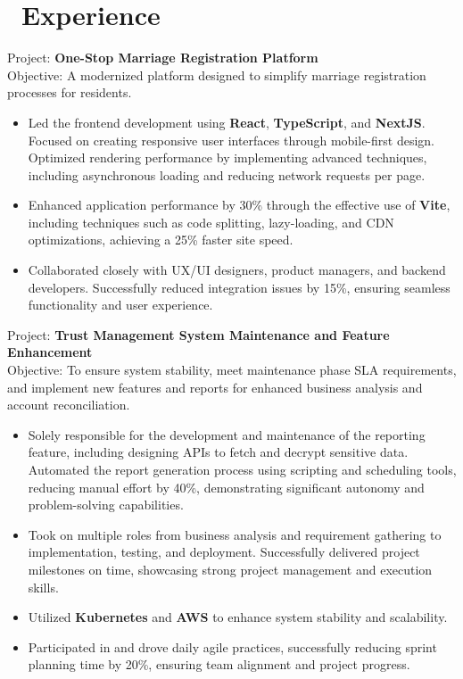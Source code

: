 \documentclass{resume}
\begin{document}
\onehalfspacing
{}



\section{\faUsers\ Experience}
\role{Software Developer}

Project: \textbf{One-Stop Marriage Registration Platform} \\
Objective: A modernized platform designed to simplify marriage registration processes for residents.
\begin{itemize}
  \item Led the frontend development using \textbf{React}, \textbf{TypeScript}, and \textbf{NextJS}. Focused on creating responsive user interfaces through mobile-first design. Optimized rendering performance by implementing advanced techniques, including asynchronous loading and reducing network requests per page.
  \item Enhanced application performance by 30\% through the effective use of \textbf{Vite}, including techniques such as code splitting, lazy-loading, and CDN optimizations, achieving a 25\% faster site speed.
  \item Collaborated closely with UX/UI designers, product managers, and backend developers. Successfully reduced integration issues by 15\%, ensuring seamless functionality and user experience.
\end{itemize}

Project: \textbf{Trust Management System Maintenance and Feature Enhancement} \\
Objective: To ensure system stability, meet maintenance phase SLA requirements, and implement new features and reports for enhanced business analysis and account reconciliation.
\begin{itemize}
  \item Solely responsible for the development and maintenance of the reporting feature, including designing APIs to fetch and decrypt sensitive data. Automated the report generation process using scripting and scheduling tools, reducing manual effort by 40\%, demonstrating significant autonomy and problem-solving capabilities.
  \item Took on multiple roles from business analysis and requirement gathering to implementation, testing, and deployment. Successfully delivered project milestones on time, showcasing strong project management and execution skills.
  \item Utilized \textbf{Kubernetes} and \textbf{AWS} to enhance system stability and scalability.
  \item Participated in and drove daily agile practices, successfully reducing sprint planning time by 20\%, ensuring team alignment and project progress.
\end{itemize}
\end{document}
